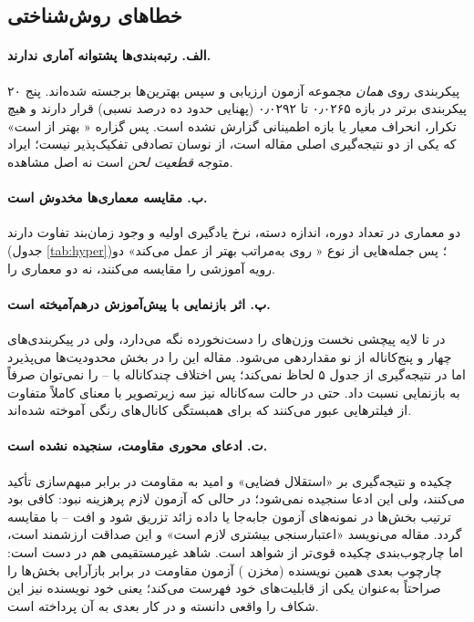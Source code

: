 \subsection{خطا‌های روش‌شناختی}

\paragraph{الف. رتبه‌بندی‌ها پشتوانه آماری ندارند.}
۲۰ پیکربندی روی \emph{همان} مجموعه آزمون ارزیابی و سپس بهترین‌ها برجسته شده‌اند. پنج پیکربندی برتر  در بازه \num{۰٫۰۲۶۵} تا \num{۰٫۰۲۹۲} (پهنایی حدود ده درصد نسبی) قرار دارند و هیچ تکرار، انحراف معیار یا بازه اطمینانی گزارش نشده است. پس گزاره « بهتر از  است» که یکی از دو نتیجه‌گیری اصلی مقاله است، از نوسان تصادفی تفکیک‌پذیر نیست؛ ایراد متوجه \emph{قطعیت لحن} است نه اصل مشاهده.

\paragraph{ب. مقایسه معماری‌ها مخدوش است.}
دو معماری در تعداد دوره، اندازه دسته، نرخ یادگیری اولیه و وجود زمان‌بند تفاوت دارند (جدول \ref{tab:hyper})؛ پس جمله‌هایی از نوع « روی  به‌مراتب بهتر از  عمل می‌کند» دو رویه آموزشی را مقایسه می‌کنند، نه دو معماری را.

\paragraph{پ. اثر بازنمایی با پیش‌آموزش درهم‌آمیخته است.}
در  تا  لایه پیچشی نخست وزن‌های  را دست‌نخورده نگه می‌دارد، ولی در پیکربندی‌های چهار و پنج‌کاناله از نو مقداردهی می‌شود. مقاله این را در بخش محدودیت‌ها می‌پذیرد اما در نتیجه‌گیری از جدول ۵ لحاظ نمی‌کند؛ پس اختلاف  چندکاناله با -- را نمی‌توان صرفاً به بازنمایی نسبت داد. حتی در حالت سه‌کاناله نیز سه زیرتصویر با معنای کاملاً متفاوت از فیلتر‌هایی عبور می‌کنند که برای همبستگی کانال‌های رنگی آموخته شده‌اند.

\paragraph{ت. ادعای محوری مقاومت، سنجیده نشده است.}
چکیده و نتیجه‌گیری بر «استقلال فضایی» و امید به مقاومت در برابر مبهم‌سازی تأکید می‌کنند، ولی این ادعا سنجیده نمی‌شود؛ در حالی که آزمون لازم پرهزینه نبود: کافی بود ترتیب بخش‌ها در نمونه‌های آزمون جابه‌جا یا داده زائد تزریق شود و افت -- با  مقایسه گردد. مقاله می‌نویسد «اعتبارسنجی بیشتری لازم است» و این صداقت ارزشمند است، اما چارچوب‌بندی چکیده قوی‌تر از شواهد است. شاهد غیرمستقیمی هم در دست است: چارچوب بعدی همین نویسنده (مخزن ) آزمون مقاومت در برابر بازآرایی بخش‌ها را صراحتاً به‌عنوان یکی از قابلیت‌های خود فهرست می‌کند؛ یعنی خود نویسنده نیز این شکاف را واقعی دانسته و در کار بعدی به آن پرداخته است.


